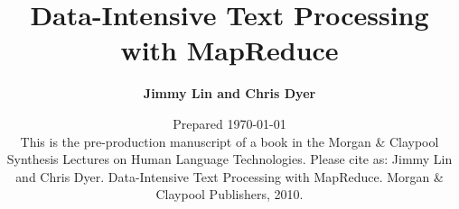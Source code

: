 \documentclass[11pt,oneside]{book}
\begin{document}
\title{\Huge \bf Data-Intensive Text Processing\\with MapReduce}
\author{\Large \bf Jimmy Lin and Chris Dyer}

\date{\vspace{5cm}Prepared \today\\
\vspace{0.5cm} \small This is the pre-production manuscript of a book
  in the Morgan \& Claypool Synthesis Lectures on Human Language
  Technologies. Please cite as: Jimmy Lin and Chris
  Dyer. Data-Intensive Text Processing with MapReduce. Morgan \&
  Claypool Publishers, 2010.}

\maketitle

\tableofcontents

\mainmatter










\end{document}
